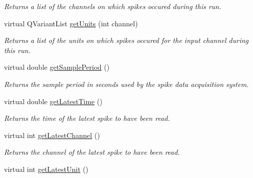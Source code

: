 \begin{DoxyCompactItemize}
\begin{DoxyCompactList}\small\item\em Returns a list of the channels on which spikes occured during this run. \end{DoxyCompactList}\item 
\hypertarget{class_picto_1_1_live_spike_reader_a511a471682436229157bebdc81a8ff01}{virtual Q\-Variant\-List \hyperlink{class_picto_1_1_live_spike_reader_a511a471682436229157bebdc81a8ff01}{get\-Units} (int channel)}\label{class_picto_1_1_live_spike_reader_a511a471682436229157bebdc81a8ff01}

\begin{DoxyCompactList}\small\item\em Returns a list of the units on which spikes occured for the input channel during this run. \end{DoxyCompactList}\item 
\hypertarget{class_picto_1_1_live_spike_reader_aed20111458fc94c992d244922aed3490}{virtual double \hyperlink{class_picto_1_1_live_spike_reader_aed20111458fc94c992d244922aed3490}{get\-Sample\-Period} ()}\label{class_picto_1_1_live_spike_reader_aed20111458fc94c992d244922aed3490}

\begin{DoxyCompactList}\small\item\em Returns the sample period in seconds used by the spike data acquisition system. \end{DoxyCompactList}\item 
\hypertarget{class_picto_1_1_live_spike_reader_aca94d9da6864604a5219d919b1eb8845}{virtual double \hyperlink{class_picto_1_1_live_spike_reader_aca94d9da6864604a5219d919b1eb8845}{get\-Latest\-Time} ()}\label{class_picto_1_1_live_spike_reader_aca94d9da6864604a5219d919b1eb8845}

\begin{DoxyCompactList}\small\item\em Returns the time of the latest spike to have been read. \end{DoxyCompactList}\item 
\hypertarget{class_picto_1_1_live_spike_reader_aa9166aa7bd8ca3cfd737eb780861b207}{virtual int \hyperlink{class_picto_1_1_live_spike_reader_aa9166aa7bd8ca3cfd737eb780861b207}{get\-Latest\-Channel} ()}\label{class_picto_1_1_live_spike_reader_aa9166aa7bd8ca3cfd737eb780861b207}

\begin{DoxyCompactList}\small\item\em Returns the channel of the latest spike to have been read. \end{DoxyCompactList}\item 
\hypertarget{class_picto_1_1_live_spike_reader_a5b68468082d4ec4abf2a58f3b62ccca2}{virtual int \hyperlink{class_picto_1_1_live_spike_reader_a5b68468082d4ec4abf2a58f3b62ccca2}{get\-Latest\-Unit} ()}\label{class_picto_1_1_live_spike_reader_a5b68468082d4ec4abf2a58f3b62ccca2}


\end{DoxyCompactItemize}
